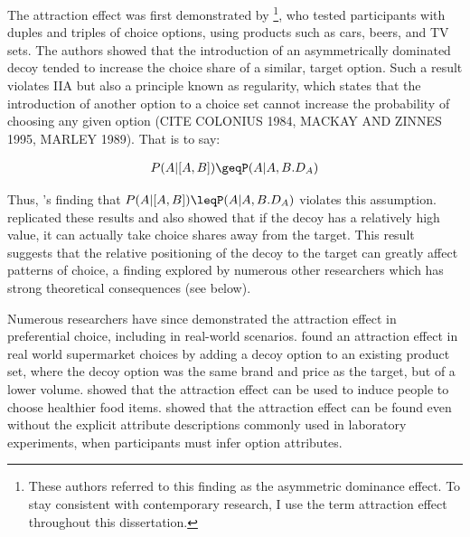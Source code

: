 \documentclass{umassthesis}          %
\begin{document}
The attraction effect was first demonstrated by \textcite{huberAddingAsymmetricallyDominated1982d}\footnote{These authors referred to this finding as the asymmetric dominance effect. To stay consistent with contemporary research, I use the term attraction effect throughout this dissertation.}, who tested participants with duples and triples of choice options, using products such as cars, beers, and TV sets. The authors showed that the introduction of an asymmetrically dominated decoy tended to increase the choice share of a similar, target option. Such a result violates IIA but also a principle known as regularity, which states that the introduction of another option to a choice set cannot increase the probability of choosing any given option (CITE COLONIUS 1984, MACKAY AND ZINNES 1995, MARLEY 1989). That is to say:

\begin{align}
  P(A|[A,B])\geqP(A|A,B.D_{A})
  \label{eqn:reg_att}
\end{align}

Thus, \textcite{huberAddingAsymmetricallyDominated1982d}'s finding that $P(A|[A,B])\leqP(A|A,B.D_{A})$ violates this assumption. \textcite{huber1983market} replicated these results and also showed that if the decoy has a relatively high value, it can actually take choice shares away from the target. This result suggests that the relative positioning of the decoy to the target can greatly affect patterns of choice, a finding explored by numerous other researchers which has strong theoretical consequences (see below). 

Numerous researchers have since demonstrated the attraction effect in preferential choice, including in real-world scenarios. \textcite{doyleRobustnessAsymmetricallyDominated1999} found an attraction effect in real world supermarket choices by adding a decoy option to an existing product set, where the decoy option was the same brand and price as the target, but of a lower volume. \textcite{van2021attract} showed that the attraction effect can be used to induce people to choose healthier food items. \textcite{slaughterDecoyEffectsAttributelevel1999b} showed that the attraction effect can be found even without the explicit attribute descriptions commonly used in laboratory experiments, when participants must infer option attributes. 
\end{document}
